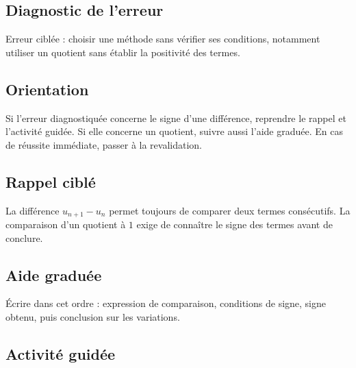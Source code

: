 

\subsection*{Diagnostic de l'erreur}
Erreur ciblée : choisir une méthode sans vérifier ses conditions, notamment
utiliser un quotient sans établir la positivité des termes.

\subsection*{Orientation}
Si l'erreur diagnostiquée concerne le signe d'une différence, reprendre le
rappel et l'activité guidée. Si elle concerne un quotient, suivre aussi
l'aide graduée. En cas de réussite immédiate, passer à la revalidation.

\subsection*{Rappel ciblé}
La différence $u_{n+1}-u_n$ permet toujours de comparer deux termes
consécutifs. La comparaison d'un quotient à $1$ exige de connaître le signe
des termes avant de conclure.

\subsection*{Aide graduée}
Écrire dans cet ordre : expression de comparaison, conditions de signe, signe
obtenu, puis conclusion sur les variations.

\subsection*{Activité guidée}


